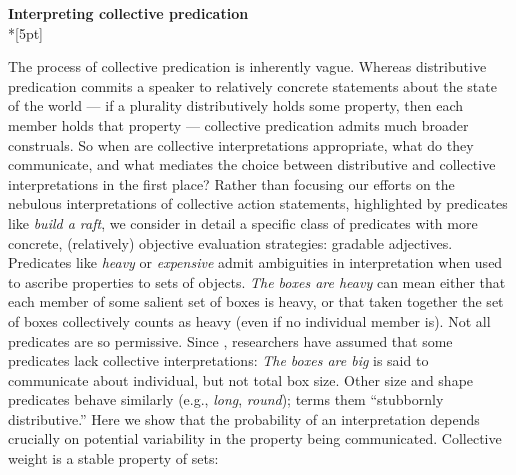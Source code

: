 \documentclass[11pt]{article}
\begin{document}
\begin{center}\textbf{Interpreting collective predication}\\*[5pt]
\end{center}

\vspace{-11pt}

	
 The process of collective predication is inherently vague. Whereas distributive predication commits a speaker to relatively concrete statements about the state of the world --- if a plurality distributively holds some property, then each member holds that property --- collective predication admits much broader construals. So when are collective interpretations appropriate, what do they communicate, and what mediates the choice between distributive and collective interpretations in the first place? Rather than focusing our efforts on the nebulous interpretations of collective action statements, highlighted by predicates like \emph{build a raft}, we consider in detail a specific class of predicates with more concrete, (relatively) objective evaluation strategies: gradable adjectives. 
  Predicates like \textit{heavy} or \textit{expensive} admit ambiguities in interpretation when used to ascribe properties to sets of objects. \textit{The boxes are heavy} can mean either that each member of some salient set of boxes is heavy, or that taken together the set of boxes collectively counts as heavy (even if no individual member is). Not all predicates are so permissive. Since \citet[p.140]{quine1960}, researchers have assumed that some predicates lack collective interpretations: \textit{The boxes are big} is said to communicate about individual, but not total box size. Other size and shape predicates behave similarly (e.g., \emph{long}, \emph{round}); \cite{schwarzschild2011} terms them ``stubbornly distributive.'' Here we show that the probability of an interpretation depends crucially on potential variability in the property being communicated. 
      Collective weight is a stable property of sets:
\end{document}
